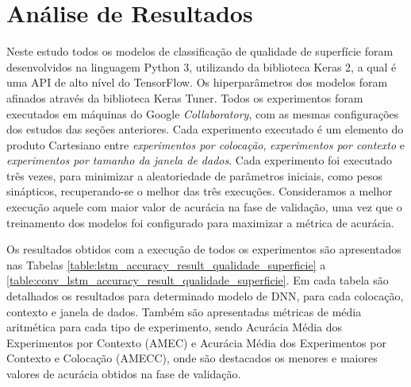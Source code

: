 \newpage
\section{Análise de Resultados}

Neste estudo todos os modelos de classificação de qualidade de superfície foram desenvolvidos na linguagem Python 3, utilizando da biblioteca Keras 2, a qual é uma API de alto nível do TensorFlow. Os hiperparâmetros dos modelos foram afinados através da biblioteca Keras Tuner. Todos os experimentos foram executados em máquinas do Google \textit{Collaboratory}, com as mesmas configurações dos estudos das seções anteriores. Cada experimento executado é um elemento do produto Cartesiano entre \emph{experimentos por colocação}, \emph{experimentos por contexto} e \emph{experimentos por tamanho da janela de dados}. Cada experimento foi executado três vezes, para minimizar a aleatoriedade de parâmetros iniciais, como pesos sinápticos, recuperando-se o melhor das três execuções. Consideramos a melhor execução aquele com maior valor de acurácia na fase de validação, uma vez que o treinamento dos modelos foi configurado para maximizar a métrica de acurácia.

Os resultados obtidos com a execução de todos os experimentos são apresentados nas Tabelas \ref{table:lstm_accuracy_result_qualidade_superficie} a \ref{table:conv_lstm_accuracy_result_qualidade_superficie}. Em cada tabela são detalhados os resultados para determinado modelo de DNN, para cada colocação, contexto e janela de dados. Também são apresentadas métricas de média aritmética para cada tipo de experimento, sendo Acurácia Média dos Experimentos por Contexto (AMEC) e Acurácia Média dos Experimentos por Contexto e Colocação (AMECC), onde são destacados os menores e maiores valores de acurácia obtidos na fase de validação.

